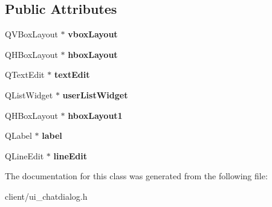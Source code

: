 \subsection*{Public Attributes}
\begin{DoxyCompactItemize}
\item 
\hypertarget{classUi__ChatDialog_a42a613611496597c83e007a750b1c72b}{Q\-V\-Box\-Layout $\ast$ {\bfseries vbox\-Layout}}\label{classUi__ChatDialog_a42a613611496597c83e007a750b1c72b}

\item 
\hypertarget{classUi__ChatDialog_a4460c6a9ec5fde2262d323d16166c5c4}{Q\-H\-Box\-Layout $\ast$ {\bfseries hbox\-Layout}}\label{classUi__ChatDialog_a4460c6a9ec5fde2262d323d16166c5c4}

\item 
\hypertarget{classUi__ChatDialog_ab1b9ec11aae9e90b163c9d616facfb6a}{Q\-Text\-Edit $\ast$ {\bfseries text\-Edit}}\label{classUi__ChatDialog_ab1b9ec11aae9e90b163c9d616facfb6a}

\item 
\hypertarget{classUi__ChatDialog_a03367dcbea7a1a2488fa6c454cb519f9}{Q\-List\-Widget $\ast$ {\bfseries user\-List\-Widget}}\label{classUi__ChatDialog_a03367dcbea7a1a2488fa6c454cb519f9}

\item 
\hypertarget{classUi__ChatDialog_a2ee484e73ae8ff60547a2f795230b17e}{Q\-H\-Box\-Layout $\ast$ {\bfseries hbox\-Layout1}}\label{classUi__ChatDialog_a2ee484e73ae8ff60547a2f795230b17e}

\item 
\hypertarget{classUi__ChatDialog_a313c5bb54dac1c18cb5286d54c472aaa}{Q\-Label $\ast$ {\bfseries label}}\label{classUi__ChatDialog_a313c5bb54dac1c18cb5286d54c472aaa}

\item 
\hypertarget{classUi__ChatDialog_abc1ae793c0cd5652f9d7b7314d367c2b}{Q\-Line\-Edit $\ast$ {\bfseries line\-Edit}}\label{classUi__ChatDialog_abc1ae793c0cd5652f9d7b7314d367c2b}

\end{DoxyCompactItemize}


The documentation for this class was generated from the following file\-:\begin{DoxyCompactItemize}
\item 
client/ui\-\_\-chatdialog.\-h\end{DoxyCompactItemize}
